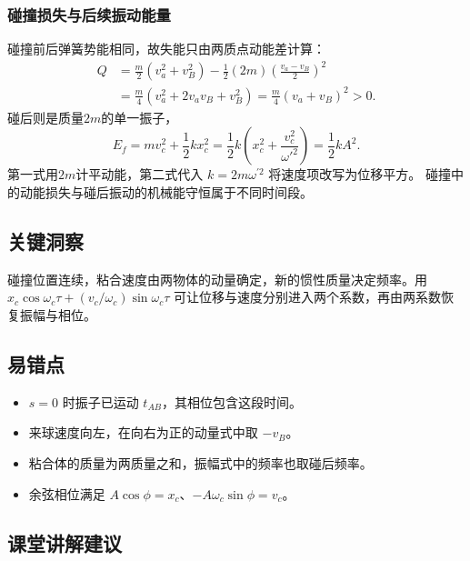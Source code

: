 \documentclass[UTF8,fontset=fandol,a4paper,11pt]{ctexart}
\begin{document}
\subsubsection*{碰撞损失与后续振动能量}
碰撞前后弹簧势能相同，故失能只由两质点动能差计算：
\[
\begin{aligned}
Q&=\frac m2(v_a^2+v_B^2)
-\frac12(2m)\left(\frac{v_a-v_B}{2}\right)^2\\
&=\frac m4(v_a^2+2v_av_B+v_B^2)
=\frac m4(v_a+v_B)^2>0.
\end{aligned}
\]
碰后则是质量$2m$的单一振子，
\[
E_f=mv_c^2+\frac12kx_c^2
=\frac12k\left(x_c^2+\frac{v_c^2}{\omega'^2}\right)
=\frac12kA^2.
\]
第一式用$2m$计平动能，第二式代入 $k=2m\omega^{\prime 2}$ 将速度项改写为位移平方。
碰撞中的动能损失与碰后振动的机械能守恒属于不同时间段。




\subsection*{关键洞察}

碰撞位置连续，粘合速度由两物体的动量确定，新的惯性质量决定频率。用 $x_c\cos\omega_c\tau+(v_c/\omega_c)\sin\omega_c\tau$ 可让位移与速度分别进入两个系数，再由两系数恢复振幅与相位。




\subsection*{易错点}

\begin{itemize}
\item $s=0$ 时振子已运动 $t_{AB}$，其相位包含这段时间。
\item 来球速度向左，在向右为正的动量式中取 $-v_B$。
\item 粘合体的质量为两质量之和，振幅式中的频率也取碰后频率。
\item 余弦相位满足 $A\cos\phi=x_c$、$-A\omega_c\sin\phi=v_c$。
\end{itemize}




\subsection*{课堂讲解建议}
\end{document}
